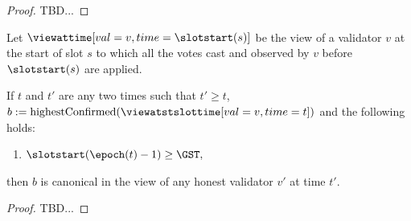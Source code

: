 \documentclass{article}
\begin{document}
\begin{proof}
    TBD...
\end{proof}


Let $\viewattime[val=v,time=\slotstart(s)]$ be the view of a validator $v$ at the start of slot $s$ to which all the votes cast and observed by $v$ before $\slotstart(s)$ are applied.

\begin{algorithm}[H]
\SetAlgoNoLine
{}
\caption{Highest Confirmed Block Selection}
\label{alg:highestconfirmed}
\end{algorithm}

\begin{lemma}
    If $t$ and $t'$ are any two times such that $t' \geq t$, $b := \text{highestConfirmed}(\viewatstslottime[val=v,time=t])$ and the following holds:
    
    \begin{enumerate}
        \item $\slotstart(\epoch(t) - 1) \geq \GST,$
    \end{enumerate}
    
    then $b$ is canonical in the view of any honest validator $v'$ at time $t'$.
\end{lemma}

\begin{proof}
    TBD...
\end{proof}
\end{document}

